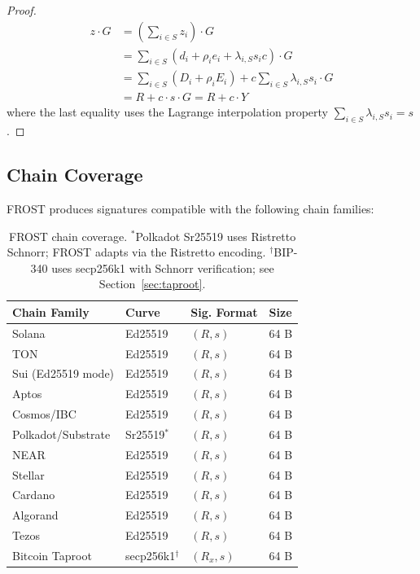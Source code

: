 \begin{proof}
\begin{align*}
z \cdot G &= \left(\sum_{i \in S} z_i\right) \cdot G \\
  &= \sum_{i \in S} \left(d_i + \rho_i e_i + \lambda_{i,S} s_i c\right) \cdot G \\
  &= \sum_{i \in S} (D_i + \rho_i E_i) + c \sum_{i \in S} \lambda_{i,S} s_i \cdot G \\
  &= R + c \cdot s \cdot G = R + c \cdot Y
\end{align*}
where the last equality uses the Lagrange interpolation property
$\sum_{i \in S} \lambda_{i,S} s_i = s$.
\end{proof}

\subsection{Chain Coverage}

FROST produces signatures compatible with the following chain families:

\begin{table}[H]
\centering
\small
\begin{tabular}{@{}llll@{}}
\toprule
\textbf{Chain Family} & \textbf{Curve} & \textbf{Sig. Format} & \textbf{Size} \\
\midrule
Solana & Ed25519 & $(R, s)$ & 64 B \\
TON & Ed25519 & $(R, s)$ & 64 B \\
Sui (Ed25519 mode) & Ed25519 & $(R, s)$ & 64 B \\
Aptos & Ed25519 & $(R, s)$ & 64 B \\
Cosmos/IBC & Ed25519 & $(R, s)$ & 64 B \\
Polkadot/Substrate & Sr25519${}^*$ & $(R, s)$ & 64 B \\
NEAR & Ed25519 & $(R, s)$ & 64 B \\
Stellar & Ed25519 & $(R, s)$ & 64 B \\
Cardano & Ed25519 & $(R, s)$ & 64 B \\
Algorand & Ed25519 & $(R, s)$ & 64 B \\
Tezos & Ed25519 & $(R, s)$ & 64 B \\
Bitcoin Taproot & secp256k1${}^\dagger$ & $(R_x, s)$ & 64 B \\
\bottomrule
\end{tabular}
\caption{FROST chain coverage. ${}^*$Polkadot Sr25519 uses Ristretto Schnorr; FROST
adapts via the Ristretto encoding. ${}^\dagger$BIP-340 uses secp256k1 with Schnorr
verification; see Section~\ref{sec:taproot}.}
\label{tab:frost-chains}
\end{table}

